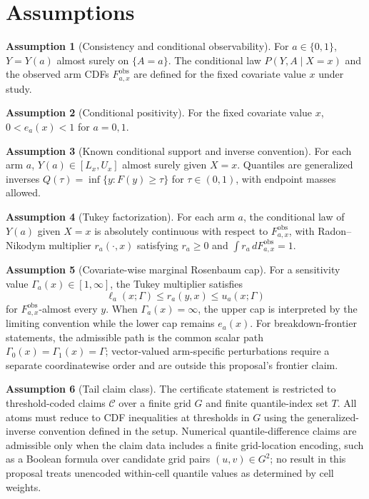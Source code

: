 \documentclass[11pt]{article}
\theoremstyle{definition}
\newtheorem{assumption}{Assumption}
\theoremstyle{plain}
\theoremstyle{remark}
\begin{document}
\section{Assumptions}
\begin{assumption}[Consistency and conditional observability]\label{ass:consistency}
For \(a\in\{0,1\}\), \(Y=Y(a)\) almost surely on \(\{A=a\}\).  The conditional law \(P(Y,A\mid X=x)\) and the observed arm CDFs \(F^{\mathrm{obs}}_{a,x}\) are defined for the fixed covariate value \(x\) under study.
\end{assumption}

\begin{assumption}[Conditional positivity]\label{ass:positivity}
For the fixed covariate value \(x\), \(0<e_a(x)<1\) for \(a=0,1\).
\end{assumption}

\begin{assumption}[Known conditional support and inverse convention]\label{ass:support}
For each arm \(a\), \(Y(a)\in[L_x,U_x]\) almost surely given \(X=x\).  Quantiles are generalized inverses \(Q(\tau)=\inf\{y:F(y)\ge\tau\}\) for \(\tau\in(0,1)\), with endpoint masses allowed.
\end{assumption}

\begin{assumption}[Tukey factorization]\label{ass:tukey}
For each arm \(a\), the conditional law of \(Y(a)\) given \(X=x\) is absolutely continuous with respect to \(F^{\mathrm{obs}}_{a,x}\), with Radon--Nikodym multiplier \(r_a(\cdot,x)\) satisfying \(r_a\ge 0\) and \(\int r_a\,dF^{\mathrm{obs}}_{a,x}=1\).
\end{assumption}

\begin{assumption}[Covariate-wise marginal Rosenbaum cap]\label{ass:msm}
For a sensitivity value \(\Gamma_a(x)\in[1,\infty]\), the Tukey multiplier satisfies
\[
\ell_a(x;\Gamma)\le r_a(y,x)\le u_a(x;\Gamma)
\]
for \(F^{\mathrm{obs}}_{a,x}\)-almost every \(y\).  When \(\Gamma_a(x)=\infty\), the upper cap is interpreted by the limiting convention while the lower cap remains \(e_a(x)\).
For breakdown-frontier statements, the admissible path is the common scalar path \(\Gamma_0(x)=\Gamma_1(x)=\Gamma\); vector-valued arm-specific perturbations require a separate coordinatewise order and are outside this proposal's frontier claim.
\end{assumption}

\begin{assumption}[Tail claim class]\label{ass:tailclaim}
The certificate statement is restricted to threshold-coded claims \(\mathcal{C}\) over a finite grid \(G\) and finite quantile-index set \(T\).  All atoms must reduce to CDF inequalities at thresholds in \(G\) using the generalized-inverse convention defined in the setup.  Numerical quantile-difference claims are admissible only when the claim data includes a finite grid-location encoding, such as a Boolean formula over candidate grid pairs \((u,v)\in G^2\); no result in this proposal treats unencoded within-cell quantile values as determined by cell weights.
\end{assumption}
\end{document}
